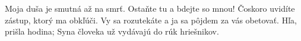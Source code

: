 Moja duša je smutná až na smrť. Ostaňte tu a bdejte so mnou!
Čoskoro uvidíte zástup, ktorý ma obkľúči.
\versseparator
Vy sa rozutekáte a ja sa pôjdem za vás obetovať.
\versseparator
Hľa, prišla hodina; Syna človeka už vydávajú do rúk hriešnikov.
